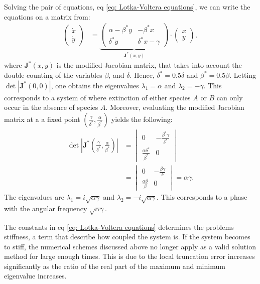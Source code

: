 \documentclass[a4paper]{article}
\newcommand{\newparagraph}{\vspace{.5cm}\noindent}
\begin{document}
\newparagraph
Solving the pair of equations, eq \eqref{eq: Lotka-Voltera equations}, we can write the equations on a matrix from:
\begin{align}
    \begin{pmatrix}
        \dot{x}\\
        \dot{y}
    \end{pmatrix} &= \underbrace{\begin{pmatrix}
        \alpha - \beta^* y & - \beta^* x \\
        \delta^* y & \delta^* x - \gamma       
    \end{pmatrix}}_{\mathbf{J}^*(x, y)}\cdot\begin{pmatrix}
        x\\
        y
    \end{pmatrix},
\end{align}where $\mathbf{J}^*(x,y)$ is the modified Jacobian matrix, that takes into account the double counting of the variables $\beta$, and $\delta$. Hence, $\delta^* = 0.5\delta$ and $\beta^* = 0.5\beta$. Letting $\det|\mathbf{J}^*(0,0)|$, one obtains the eigenvalues $\lambda_1 = \alpha$ and $\lambda_2 = -\gamma$. This corresponds to a system of where extinction of either species $A$ or $B$ can only occur in the absence of species $A$.
Moreover, evaluating the modified Jacobian matrix at a a fixed point $\left(\frac{\gamma}{\delta^*}, \frac{\alpha}{\beta^*}\right)$ yields the following:
\begin{align*}
    \det\left|\mathbf{J}^* \left(\frac{\gamma}{\delta^*}, \frac{\alpha}{\beta^*}\right)\right| &= \begin{vmatrix}
        0 & - \frac{\beta^*\gamma}{\delta^*}\\
        \frac{\alpha\delta^*}{\beta^*}&0
    \end{vmatrix}\\
    &= \begin{vmatrix}
        0 & - \frac{\beta\gamma}{\delta}\\
        \frac{\alpha\delta}{\beta}&0
    \end{vmatrix} = \alpha\gamma.
\end{align*}The eigenvalues are $\lambda_1 = i\sqrt{\alpha\gamma}$ and $\lambda_2 = -i \sqrt{\alpha\gamma}$. This corresponds to a phase with the angular frequency $\sqrt{\alpha\gamma}$.

\newparagraph
The constants in eq \eqref{eq: Lotka-Voltera equations} determines the problems stiffness, a term that describe how coupled the system is. If the system becomes to stiff, the numerical schemes discussed above no longer apply as a valid solution method for large enough times. This is due to the local truncation error increases significantly as the ratio of the real part of the maximum and minimum eigenvalue increases. 
\end{document}
